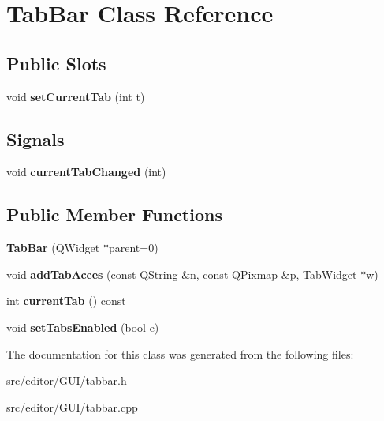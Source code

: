 \hypertarget{class_tab_bar}{\section{\-Tab\-Bar \-Class \-Reference}
\label{class_tab_bar}
}
\subsection*{\-Public \-Slots}
\begin{DoxyCompactItemize}
\item 
\hypertarget{class_tab_bar_a71b20e36e9d73a3ab7de30af404b4f67}{void {\bfseries set\-Current\-Tab} (int t)}\label{class_tab_bar_a71b20e36e9d73a3ab7de30af404b4f67}

\end{DoxyCompactItemize}
\subsection*{\-Signals}
\begin{DoxyCompactItemize}
\item 
\hypertarget{class_tab_bar_af1823815958705f27ab8e7a90262c27e}{void {\bfseries current\-Tab\-Changed} (int)}\label{class_tab_bar_af1823815958705f27ab8e7a90262c27e}

\end{DoxyCompactItemize}
\subsection*{\-Public \-Member \-Functions}
\begin{DoxyCompactItemize}
\item 
\hypertarget{class_tab_bar_ad91da41e8bfec9cf184f36b49ba4bf6b}{{\bfseries \-Tab\-Bar} (\-Q\-Widget $\ast$parent=0)}\label{class_tab_bar_ad91da41e8bfec9cf184f36b49ba4bf6b}

\item 
\hypertarget{class_tab_bar_a4eb314982505463c3244a007b4e5a813}{void {\bfseries add\-Tab\-Acces} (const \-Q\-String \&n, const \-Q\-Pixmap \&p, \hyperlink{class_tab_widget}{\-Tab\-Widget} $\ast$w)}\label{class_tab_bar_a4eb314982505463c3244a007b4e5a813}

\item 
\hypertarget{class_tab_bar_a78cf61eaaaf5ceed7de52bc3ff1ca07c}{int {\bfseries current\-Tab} () const }\label{class_tab_bar_a78cf61eaaaf5ceed7de52bc3ff1ca07c}

\item 
\hypertarget{class_tab_bar_a6bb891b77ab937e8d97022cf7d46cf3a}{void {\bfseries set\-Tabs\-Enabled} (bool e)}\label{class_tab_bar_a6bb891b77ab937e8d97022cf7d46cf3a}

\end{DoxyCompactItemize}


\-The documentation for this class was generated from the following files\-:\begin{DoxyCompactItemize}
\item 
src/editor/\-G\-U\-I/tabbar.\-h\item 
src/editor/\-G\-U\-I/tabbar.\-cpp\end{DoxyCompactItemize}
